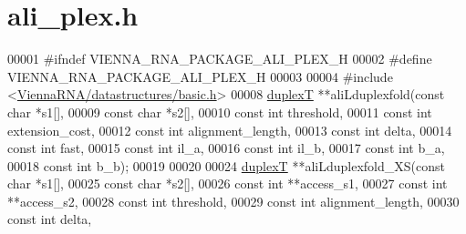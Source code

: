\hypertarget{ali__plex_8h_source}{}\section{ali\+\_\+plex.\+h}
\label{ali__plex_8h_source}

\begin{DoxyCode}
00001 \textcolor{preprocessor}{#ifndef VIENNA\_RNA\_PACKAGE\_ALI\_PLEX\_H}
00002 \textcolor{preprocessor}{#define VIENNA\_RNA\_PACKAGE\_ALI\_PLEX\_H}
00003 
00004 \textcolor{preprocessor}{#include <\hyperlink{datastructures_2basic_8h}{ViennaRNA/datastructures/basic.h}>}
00008 \hyperlink{group__data__structures_structduplexT}{duplexT} **aliLduplexfold(\textcolor{keyword}{const} \textcolor{keywordtype}{char} *s1[],
00009                          \textcolor{keyword}{const} \textcolor{keywordtype}{char} *s2[],
00010                          \textcolor{keyword}{const} \textcolor{keywordtype}{int}  threshold,
00011                          \textcolor{keyword}{const} \textcolor{keywordtype}{int}  extension\_cost,
00012                          \textcolor{keyword}{const} \textcolor{keywordtype}{int}  alignment\_length,
00013                          \textcolor{keyword}{const} \textcolor{keywordtype}{int}  delta,
00014                          \textcolor{keyword}{const} \textcolor{keywordtype}{int}  fast,
00015                          \textcolor{keyword}{const} \textcolor{keywordtype}{int}  il\_a,
00016                          \textcolor{keyword}{const} \textcolor{keywordtype}{int}  il\_b,
00017                          \textcolor{keyword}{const} \textcolor{keywordtype}{int}  b\_a,
00018                          \textcolor{keyword}{const} \textcolor{keywordtype}{int}  b\_b);
00019 
00020 
00024 \hyperlink{group__data__structures_structduplexT}{duplexT} **aliLduplexfold\_XS(\textcolor{keyword}{const} \textcolor{keywordtype}{char}  *s1[],
00025                             \textcolor{keyword}{const} \textcolor{keywordtype}{char}  *s2[],
00026                             \textcolor{keyword}{const} \textcolor{keywordtype}{int}   **access\_s1,
00027                             \textcolor{keyword}{const} \textcolor{keywordtype}{int}   **access\_s2,
00028                             \textcolor{keyword}{const} \textcolor{keywordtype}{int}   threshold,
00029                             \textcolor{keyword}{const} \textcolor{keywordtype}{int}   alignment\_length,
00030                             \textcolor{keyword}{const} \textcolor{keywordtype}{int}   delta,

\end{DoxyCode}
